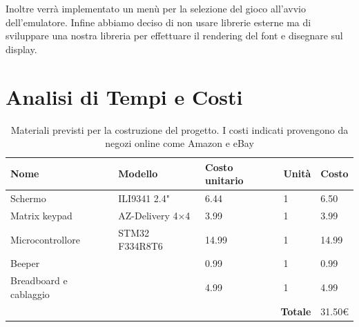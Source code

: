 \documentclass[a4paper]{article}
\begin{document}
Inoltre verrà implementato un menù per la selezione del gioco all'avvio dell'emulatore. Infine abbiamo deciso di non usare librerie esterne ma di sviluppare una nostra libreria per effettuare il rendering del font e disegnare sul display.

\section{Analisi di Tempi e Costi}

\begin{center}
	\begin{table}[h]
		\centering
		\begin{tabular}{|llll|l|}
			\hline
			\multicolumn{1}{|l|}{\textbf{Nome}}          & \multicolumn{1}{l|}{\textbf{Modello}}       & \multicolumn{1}{l|}{\textbf{Costo unitario}} & \textbf{Unità} & \textbf{Costo} \\ \hline
			\multicolumn{1}{|l|}{Schermo}                & \multicolumn{1}{l|}{ILI9341 2.4"}           & \multicolumn{1}{l|}{6.44}                    & 1               & 6.50           \\ \hline
			\multicolumn{1}{|l|}{Matrix keypad}          & \multicolumn{1}{l|}{AZ-Delivery 4$\times$4} & \multicolumn{1}{l|}{3.99}                    & 1               & 3.99           \\ \hline
			\multicolumn{1}{|l|}{Microcontrollore}       & \multicolumn{1}{l|}{STM32 F334R8T6}         & \multicolumn{1}{l|}{14.99}                   & 1               & 14.99          \\ \hline
			\multicolumn{1}{|l|}{Beeper}                 & \multicolumn{1}{l|}{}                       & \multicolumn{1}{l|}{0.99}                    & 1               & 0.99           \\ \hline
			\multicolumn{1}{|l|}{Breadboard e cablaggio} & \multicolumn{1}{l|}{}                       & \multicolumn{1}{l|}{4.99}                    & 1               & 4.99           \\ \hline
			\multicolumn{4}{|r|}{\textbf{Totale}}                                                                                                            & 31.50\euro        \\ \hline
		\end{tabular}
		\caption{
			Materiali previsti per la costruzione del progetto. I costi indicati
			provengono da negozi online come Amazon e eBay
		}
	\end{table}
\end{center}
\end{document}
